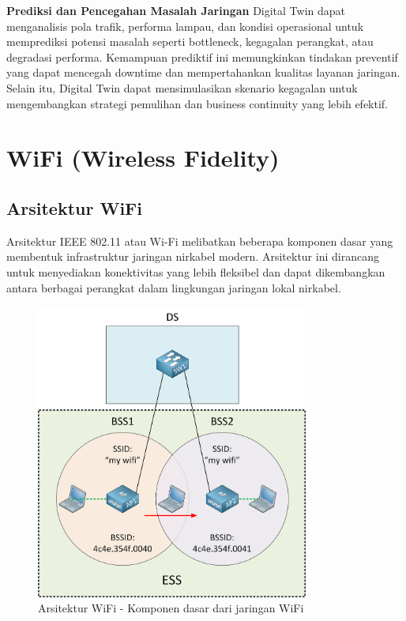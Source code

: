 \textbf{Prediksi dan Pencegahan Masalah Jaringan} Digital Twin dapat menganalisis pola trafik, performa lampau, dan kondisi operasional untuk memprediksi potensi masalah seperti bottleneck, kegagalan perangkat, atau degradasi performa. Kemampuan prediktif ini memungkinkan tindakan preventif yang dapat mencegah downtime dan mempertahankan kualitas layanan jaringan. Selain itu, Digital Twin dapat mensimulasikan skenario kegagalan untuk mengembangkan strategi pemulihan dan business continuity yang lebih efektif.

\section{WiFi (Wireless Fidelity)}

\subsection{Arsitektur WiFi}

Arsitektur IEEE 802.11 atau Wi-Fi melibatkan beberapa komponen dasar yang membentuk infrastruktur jaringan nirkabel modern. Arsitektur ini dirancang untuk menyediakan konektivitas yang lebih fleksibel dan dapat dikembangkan antara berbagai perangkat dalam lingkungan jaringan lokal nirkabel.

\begin{figure}[htbp]
    \centering
    \includegraphics[width=0.8\textwidth]{assets/pics/bab3_3.png}
    \caption{Arsitektur WiFi - Komponen dasar dari jaringan WiFi}
    \label{fig:digital_twin_concept}
\end{figure}

